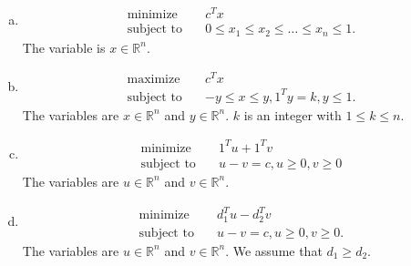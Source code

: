 \documentclass{article}
\begin{document}
\begin{enumerate}[(a)]
\item 
\begin{align*}
\text{minimize} \quad & c^T x \\
\text{subject to} \quad & 0 \leq x_1 \leq x_2 \leq \ldots \leq x_n \leq 1.
\end{align*}
The variable is $x \in \mathbb{R}^n$.

\item 
\begin{align*}
\text{maximize} \quad & c^T x \\
\text{subject to} \quad & -y \leq x \leq y, 1^T y = k, y \leq 1.
\end{align*}
The variables are $x \in \mathbb{R}^n$ and $y \in \mathbb{R}^n$. $k$ is an integer with $1 \leq k \leq n$.

\item 
\begin{align*}
\text{minimize} \quad & 1^T u + 1^T v \\
\text{subject to} \quad & u - v = c, u \geq 0, v \geq 0
\end{align*}
The variables are $u \in \mathbb{R}^n$ and $v \in \mathbb{R}^n$.

\item 
\begin{align*}
\text{minimize} \quad & d_1^T u - d_2^T v \\
\text{subject to} \quad & u - v = c, u \geq 0, v \geq 0.
\end{align*}
The variables are $u \in \mathbb{R}^n$ and $v \in \mathbb{R}^n$. We assume that $d_1 \geq d_2$.
\end{enumerate}
\end{document}

